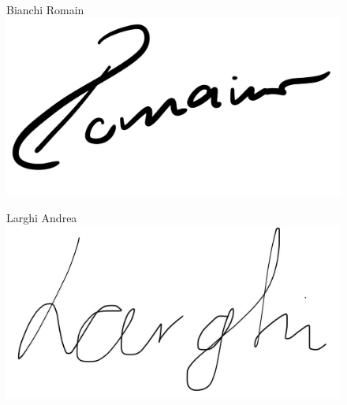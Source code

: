 \documentclass{rapport}
\begin{document}
\begin{figure}[H]
    \centering
    \begin{minipage}[b]{0.3\textwidth}
      \centering
      Bianchi Romain\\
      \includegraphics[height=0.4\textwidth]{Images/Bianchi.jpg}
    \end{minipage}
    \hfill
    \begin{minipage}[b]{0.3\textwidth}
      \centering
      Larghi Andrea\\
      \includegraphics[height=0.4\textwidth]{Images/AL_Signature.jpg}
    \end{minipage}
  \end{figure}

\newpage
\printbibliography %


\newpage
\appendix

% 

\end{document}
